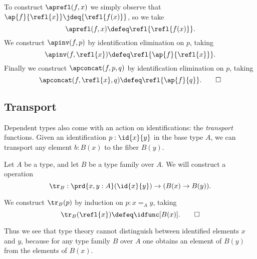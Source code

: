 \begin{constr}
To construct $\aprefl(f,x)$ we simply observe that ${\ap{f}{\refl{x}}}\jdeq {\refl{f(x)}}$, so we take
\begin{equation*}
\aprefl(f,x)\defeq\refl{\refl{f(x)}}.
\end{equation*}
We construct $\apinv(f,p)$ by identification elimination on $p$, taking
\begin{equation*}
\apinv(f,\refl{x}) \defeq \refl{\ap{f}{\refl{x}}}.
\end{equation*}
Finally we construct $\apconcat(f,p,q)$ by identification elimination on $p$, taking
\begin{equation*}
\apconcat(f,\refl{x},q)  \defeq \refl{\ap{f}{q}}.\qedhere
\end{equation*}
\end{constr}

\subsection{Transport}

Dependent types also come with an action on identifications: the \emph{transport} functions.
Given an identification $p:\id{x}{y}$ in the base type $A$, we can transport any element $b:B(x)$ to the fiber $B(y)$.

\begin{defn}
Let $A$ be a type, and let $B$ be a type family over $A$.
We will construct a  operation
\begin{equation*}
\tr_B:\prd{x,y:A} (\id{x}{y})\to (B(x)\to B(y)).
\end{equation*}
\end{defn}

\begin{constr}
We construct $\tr_B(p)$ by induction on $p:x=_A y$, taking
\begin{equation*}
\tr_B(\refl{x}) \defeq \idfunc[B(x)].\qedhere
\end{equation*}
\end{constr}

Thus we see that type theory cannot distinguish between identified elements $x$ and $y$, because for any type family $B$ over $A$ one obtains an element of $B(y)$ from the elements of $B(x)$.

